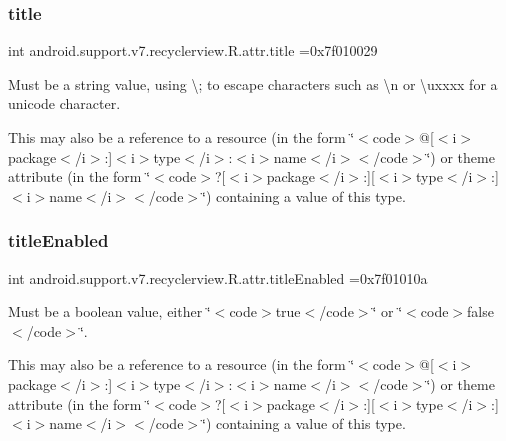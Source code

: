\subsubsection{\texorpdfstring{title}{title}}
{\footnotesize\ttfamily int android.\+support.\+v7.\+recyclerview.\+R.\+attr.\+title =0x7f010029\hspace{0.3cm}{\ttfamily [static]}}

Must be a string value, using \textquotesingle{}\textbackslash{};\textquotesingle{} to escape characters such as \textquotesingle{}\textbackslash{}n\textquotesingle{} or \textquotesingle{}\textbackslash{}uxxxx\textquotesingle{} for a unicode character. 

This may also be a reference to a resource (in the form \char`\"{}$<$code$>$@\mbox{[}$<$i$>$package$<$/i$>$\+:\mbox{]}$<$i$>$type$<$/i$>$\+:$<$i$>$name$<$/i$>$$<$/code$>$\char`\"{}) or theme attribute (in the form \char`\"{}$<$code$>$?\mbox{[}$<$i$>$package$<$/i$>$\+:\mbox{]}\mbox{[}$<$i$>$type$<$/i$>$\+:\mbox{]}$<$i$>$name$<$/i$>$$<$/code$>$\char`\"{}) containing a value of this type. \mbox{\label{classandroid_1_1support_1_1v7_1_1recyclerview_1_1R_1_1attr_a86ef1840ac5538d23ae4ab4fa8b2ec6b}} 
\subsubsection{\texorpdfstring{title\+Enabled}{titleEnabled}}
{\footnotesize\ttfamily int android.\+support.\+v7.\+recyclerview.\+R.\+attr.\+title\+Enabled =0x7f01010a\hspace{0.3cm}{\ttfamily [static]}}

Must be a boolean value, either \char`\"{}$<$code$>$true$<$/code$>$\char`\"{} or \char`\"{}$<$code$>$false$<$/code$>$\char`\"{}. 

This may also be a reference to a resource (in the form \char`\"{}$<$code$>$@\mbox{[}$<$i$>$package$<$/i$>$\+:\mbox{]}$<$i$>$type$<$/i$>$\+:$<$i$>$name$<$/i$>$$<$/code$>$\char`\"{}) or theme attribute (in the form \char`\"{}$<$code$>$?\mbox{[}$<$i$>$package$<$/i$>$\+:\mbox{]}\mbox{[}$<$i$>$type$<$/i$>$\+:\mbox{]}$<$i$>$name$<$/i$>$$<$/code$>$\char`\"{}) containing a value of this type. \mbox{\label{classandroid_1_1support_1_1v7_1_1recyclerview_1_1R_1_1attr_a7ae1d2779edb2b16c5d356d2d5cf04d4}} 
